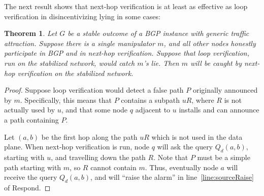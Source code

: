 \documentclass[pdftex,twoside,twocolumn,10pt,letterpaper]{article}
\newtheorem{theorem}{Theorem}
\begin{document}
  The next result shows that next-hop verification is at least as
  effective as loop verification in disincentivizing lying in some cases:
  \begin{theorem}
    Let $G$ be a stable outcome of a BGP instance with generic traffic attraction.
    Suppose there is a single manipulator $m$,
    and all other nodes honestly participate in BGP and in next-hop verification.
    Suppose that loop verification, run on the stabilized network,
    would catch $m$'s lie.
    Then $m$ will be caught by next-hop verification on the stabilized network.
  \end{theorem}
  \begin{proof}
    Suppose loop verification would detect a false path $P$ originally announced
    by $m$. Specifically, this means that $P$ contains a subpath $uR$, where $R$ is not
    actually used by $u$, and that some node $q$ adjacent to $u$ installs and can
    announce a path containing $P$.

    Let $(a,b)$ be the first hop along the path $uR$ which is not used in the
    data plane. When next-hop verification is run, node $q$ will ask the query
    $Q_d(a,b)$, starting with $u$, and travelling down the path $R$.
    Note that $P$ must be a simple path starting with $m$,
    so $R$ cannot contain $m$.
    Thus, eventually node $a$ will receive the query $Q_d(a,b)$, and will
    ``raise the alarm'' in line~\ref{line:sourceRaise} of {\sc Respond}.


\end{proof}
\end{document}
